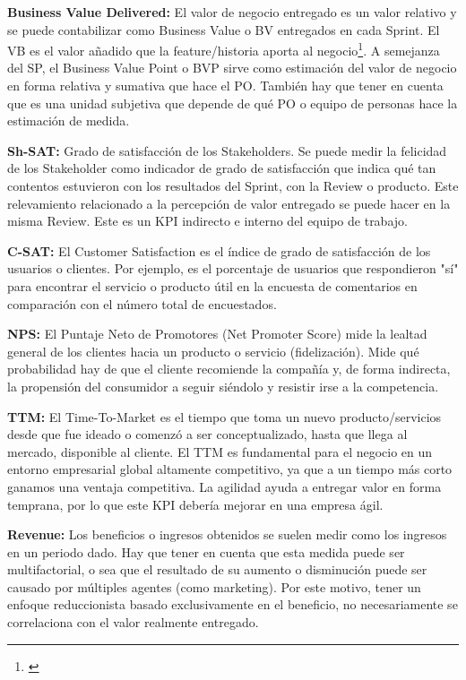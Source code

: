   \begin{description}    

  \item {\textbf{Business Value Delivered:} El valor de negocio entregado es un valor relativo y se puede contabilizar como Business Value o BV entregados en cada Sprint. El VB es el valor añadido que la feature/historia aporta al negocio\footnote{\cite{Pointet-Botton-2012}}. A semejanza del SP, el Business Value Point o BVP sirve como estimación del valor de negocio en forma relativa y sumativa que hace el PO. También hay que tener en cuenta que es una unidad subjetiva que depende de qué PO o equipo de personas hace la estimación de medida.
} 
 
  \item {\textbf{Sh-SAT:} Grado de satisfacción de los Stakeholders. Se puede medir la felicidad de los Stakeholder como indicador de grado de satisfacción que indica qué tan contentos estuvieron con los resultados del Sprint, con la Review o producto. Este relevamiento relacionado a la percepción de valor entregado se puede hacer en la misma Review. Este es un KPI indirecto e interno del equipo de trabajo.
}

  \item {\textbf{C-SAT:} El Customer Satisfaction es el índice de grado de satisfacción de los usuarios o clientes. Por ejemplo, es el porcentaje de usuarios que respondieron "sí" para encontrar el servicio o producto útil en la encuesta de comentarios en comparación con el número total de encuestados.
}

  \item {\textbf{NPS:} El Puntaje Neto de Promotores (Net Promoter Score) mide la lealtad general de los clientes hacia un producto o servicio (fidelización). Mide qué probabilidad hay de que el cliente recomiende la compañía y, de forma indirecta, la propensión del consumidor a seguir siéndolo y resistir irse a la competencia.
}

  \item {\textbf{TTM:} El Time-To-Market es el tiempo que toma un nuevo producto/servicios desde que fue ideado o comenzó a ser conceptualizado, hasta que llega al mercado, disponible al cliente. El TTM es fundamental para el negocio en un entorno empresarial global altamente competitivo, ya que a un tiempo más corto ganamos una ventaja competitiva. La agilidad ayuda a entregar valor en forma temprana, por lo que este KPI debería mejorar en una empresa ágil.
}

  \item {\textbf{Revenue:} Los beneficios o ingresos obtenidos se suelen medir como los ingresos en un periodo dado. Hay que tener en cuenta que esta medida puede ser multifactorial, o sea que el resultado de su aumento o disminución puede ser causado por múltiples agentes (como marketing). Por este motivo, tener un enfoque reduccionista basado exclusivamente en el beneficio, no necesariamente se correlaciona con el valor realmente entregado.
}


\end{description}
